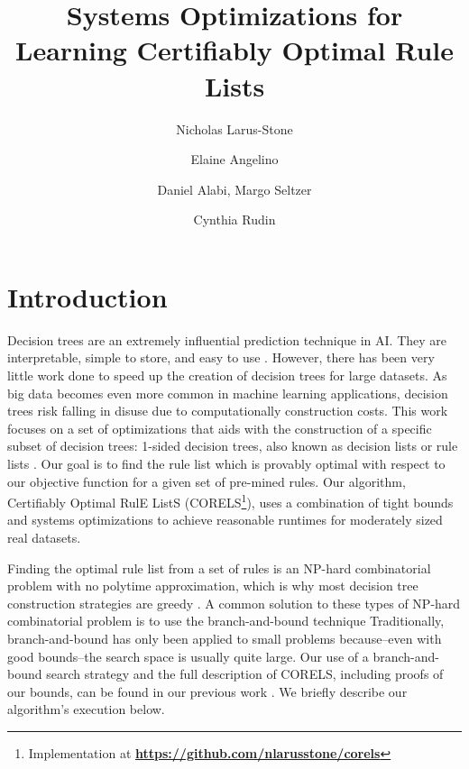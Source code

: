 \documentclass[format=sigconf]{acmart}
\begin{document}
\title{Systems Optimizations for Learning Certifiably Optimal Rule Lists}
\author{Nicholas Larus-Stone}

\author{Elaine Angelino}

\author{Daniel Alabi, Margo Seltzer}

\author{Cynthia Rudin}

\maketitle

\section{Introduction}
Decision trees are an extremely influential prediction technique in AI.
They are interpretable, simple to store, and easy to use \cite{BreimanFrOlSt84}.
However, there has been very little work done to speed up the creation of decision trees for large datasets.
As big data becomes even more common in machine learning applications, decision trees risk falling in disuse due to computationally construction costs.
This work focuses on a set of optimizations that aids with the construction of a specific subset of decision trees: 1-sided decision trees, also known as decision lists or rule lists \cite{Rivest87}.
Our goal is to find the rule list which is provably optimal with respect to our objective function for a given set of pre-mined rules.
Our algorithm, Certifiably Optimal RulE ListS (CORELS\footnote{Implementation at \textbf{\url{https://github.com/nlarusstone/corels}}}), uses a combination of tight bounds and systems optimizations to achieve reasonable runtimes for moderately sized real datasets.

Finding the optimal rule list from a set of rules is an NP-hard combinatorial problem with no polytime approximation, which is why most decision tree construction strategies are greedy \citep{BreimanFrOlSt84, Quinlan93}.
A common solution to these types of NP-hard combinatorial problem is to use the branch-and-bound technique \citep{Clausen99}
Traditionally, branch-and-bound has only been applied to small problems because--even with good bounds--the search space is usually quite large.
Our use of a branch-and-bound search strategy and the full description of CORELS, including proofs of our bounds, can be found in our previous work \cite{AngelinoLaAlSeRu17}.
We briefly describe our algorithm's execution below.
\end{document}
